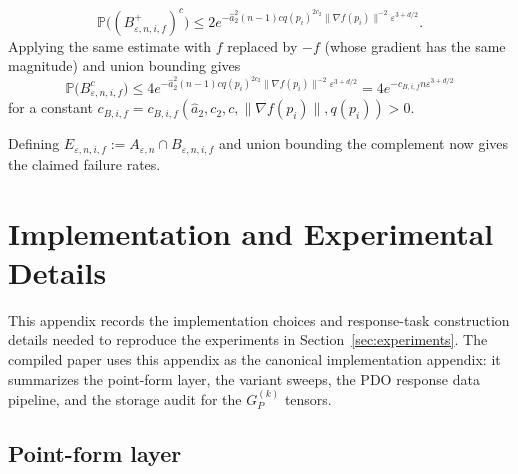 \documentclass{article}
\let\todo\undefined
\let\todo\undefined
\newcommand{\todo}[1][]{}
\theoremstyle{remark}
\theoremstyle{plain}
\begin{document}
\begin{equation}
\mathbb{P}\big((B_{\varepsilon,n,i,f}^{+})^{c}\big) \leq 2 e^{ -\hat{a}_{2}^{2} (n-1)c q(p_{i})^{2c_{2}} \|\nabla f (p_{i})\|^{-2} \varepsilon^{3+d/2}  }.
\end{equation}
Applying the same estimate with $f$ replaced by $-f$ (whose gradient has the same magnitude) and union bounding gives
\begin{equation}
\mathbb{P}\big( B_{\varepsilon, n, i, f}^{c} \big) \leq 4 e^{ -\hat{a}_{2}^{2} (n-1)c q(p_{i})^{2c_{2}} \|\nabla f (p_{i})\|^{-2} \varepsilon^{3+d/2}  }=4 e^{-c_{B,i, f}n \varepsilon^{3+d/2}}
\end{equation}
for a constant $c_{B,i,f}=c_{B,i,f}(\hat{a}_{2}, c_{2}, c, \|\nabla f(p_{i})\|, q(p_{i}))>0$.

Defining $E_{\varepsilon,n, i, f}:=A_{\varepsilon, n} \cap B_{\varepsilon, n, i, f}$ and union bounding the complement now gives the claimed failure rates.








\section{Implementation and Experimental Details}
\label{appendix:C}
\label{app:implementation-details}
\providecommand{\asinh}{\operatorname{asinh}}

This appendix records the implementation choices and response-task construction details needed to reproduce the experiments in Section~\ref{sec:experiments}. The compiled paper uses this appendix as the canonical implementation appendix: it summarizes the point-form layer, the variant sweeps, the PDO response data pipeline, and the storage audit for the \(G_P^{(k)}\) tensors.

\subsection{Point-form layer}
\end{document}

